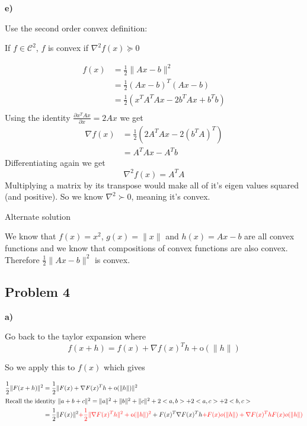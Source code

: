 \textbf{e)}

\answer

Use the second order convex definition:

If $f \in \mathcal{C}^2$, $f$ is convex if $\nabla^2 f(x) \succeq 0$

\begin{align*}
	f(x) &= \frac{1}{2} \| Ax-b\|^2 \\
	&= \frac{1}{2} (Ax-b)^T(Ax-b) \\
	&= \frac{1}{2} (x^TA^TAx - 2b^TAx + b^Tb) \\
\end{align*}
Using the identity $\frac{\partial x^T A x}{\partial x} = 2Ax$ we get
\begin{align*}
	\nabla f(x) &= \frac{1}{2} (2A^TAx - 2(b^TA)^T) \\
	&= A^TAx - A^Tb
\end{align*}
Differentiating again we get
\[
	\nabla^2 f(x) = A^TA
\]
Multiplying a matrix by its transpose would make all of it's eigen values squared (and positive). So we know $\nabla^2 \succ 0$, meaning it's convex.


\color{red}
Alternate solution

We know that $f(x) = x^2$, $g(x) = \|x\|$ and $h(x) = Ax-b$ are all convex functions and we know that compositions of convex functions are also convex. Therefore $\frac{1}{2} \| Ax-b\|^2$ is convex.

\color{black}

\subsection{Problem 4}

\textbf{a)}

\answer

Go back to the taylor expansion where
\[
	f(x+h) = f(x) + \nabla f(x)^Th + \text{o}(\| h\|)
\]

So we apply this to $f(x)$ which gives

\begin{align*}
	\frac{1}{2} \| F(x+h) \|^2 &= \frac{1}{2} \| F(x) + \nabla F(x)^Th + \text{o}(\| h\|) \|^2 \\
\intertext{Recall the identity $\| a + b + c\|^2 = \|a\|^2 + \|b\|^2 + \|c\|^2 + 2<a,b> + 2<a,c> + 2<b,c>$}
	&= \frac{1}{2} \|  F(x)\|^2 \textcolor{red}{+ \frac{1}{2} \|  \nabla F(x)^Th\|^2 + \text{o}(\| h\|)^2}
		+ F(x)^T \nabla F(x)^Th \textcolor{red}{+ F(x)o(\|h\|) + \nabla F(x)^ThF(x)o(\|h\|)}
\end{align*}

